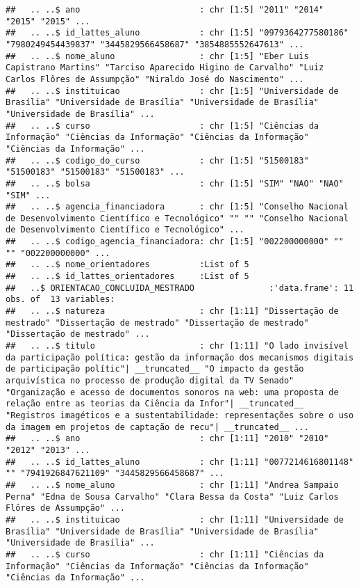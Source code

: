 \documentclass[]{article}
\begin{document}
\begin{verbatim}
##   .. ..$ ano                        : chr [1:5] "2011" "2014" "2015" "2015" ...
##   .. ..$ id_lattes_aluno            : chr [1:5] "0979364277580186" "7980249454439837" "3445829566458687" "3854885552647613" ...
##   .. ..$ nome_aluno                 : chr [1:5] "Eber Luis Capistrano Martins" "Tarciso Aparecido Higino de Carvalho" "Luiz Carlos Flôres de Assumpção" "Niraldo José do Nascimento" ...
##   .. ..$ instituicao                : chr [1:5] "Universidade de Brasília" "Universidade de Brasília" "Universidade de Brasília" "Universidade de Brasília" ...
##   .. ..$ curso                      : chr [1:5] "Ciências da Informação" "Ciências da Informação" "Ciências da Informação" "Ciências da Informação" ...
##   .. ..$ codigo_do_curso            : chr [1:5] "51500183" "51500183" "51500183" "51500183" ...
##   .. ..$ bolsa                      : chr [1:5] "SIM" "NAO" "NAO" "SIM" ...
##   .. ..$ agencia_financiadora       : chr [1:5] "Conselho Nacional de Desenvolvimento Científico e Tecnológico" "" "" "Conselho Nacional de Desenvolvimento Científico e Tecnológico" ...
##   .. ..$ codigo_agencia_financiadora: chr [1:5] "002200000000" "" "" "002200000000" ...
##   .. ..$ nome_orientadores          :List of 5
##   .. ..$ id_lattes_orientadores     :List of 5
##   ..$ ORIENTACAO_CONCLUIDA_MESTRADO               :'data.frame': 11 obs. of  13 variables:
##   .. ..$ natureza                   : chr [1:11] "Dissertação de mestrado" "Dissertação de mestrado" "Dissertação de mestrado" "Dissertação de mestrado" ...
##   .. ..$ titulo                     : chr [1:11] "O lado invisível da participação política: gestão da informação dos mecanismos digitais de participação polític"| __truncated__ "O impacto da gestão arquivística no processo de produção digital da TV Senado" "Organização e acesso de documentos sonoros na web: uma proposta de relação entre as teorias da Ciência da Infor"| __truncated__ "Registros imagéticos e a sustentabilidade: representações sobre o uso da imagem em projetos de captação de recu"| __truncated__ ...
##   .. ..$ ano                        : chr [1:11] "2010" "2010" "2012" "2013" ...
##   .. ..$ id_lattes_aluno            : chr [1:11] "0077214616801148" "" "7941926847621109" "3445829566458687" ...
##   .. ..$ nome_aluno                 : chr [1:11] "Andrea Sampaio Perna" "Edna de Sousa Carvalho" "Clara Bessa da Costa" "Luiz Carlos Flôres de Assumpção" ...
##   .. ..$ instituicao                : chr [1:11] "Universidade de Brasília" "Universidade de Brasília" "Universidade de Brasília" "Universidade de Brasília" ...
##   .. ..$ curso                      : chr [1:11] "Ciências da Informação" "Ciências da Informação" "Ciências da Informação" "Ciências da Informação" ...

\end{verbatim}
\end{document}
